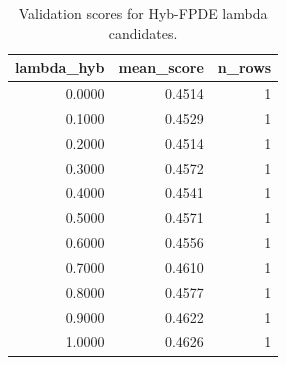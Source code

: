 \begin{table}[t]
\caption{Validation scores for Hyb-FPDE lambda candidates.}
\label{tab:lambda_distribution_computed}
\centering
\begin{tabular}{rrr}
\toprule
lambda\_hyb & mean\_score & n\_rows \\
\midrule
0.0000 & 0.4514 & 1 \\
0.1000 & 0.4529 & 1 \\
0.2000 & 0.4514 & 1 \\
0.3000 & 0.4572 & 1 \\
0.4000 & 0.4541 & 1 \\
0.5000 & 0.4571 & 1 \\
0.6000 & 0.4556 & 1 \\
0.7000 & 0.4610 & 1 \\
0.8000 & 0.4577 & 1 \\
0.9000 & 0.4622 & 1 \\
1.0000 & 0.4626 & 1 \\
\bottomrule
\end{tabular}

\end{table}
